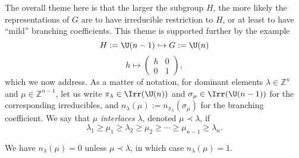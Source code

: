 \documentclass[reqno]{amsart} 
\begin{document}
The overall theme here is that the larger the subgroup $H$, the more likely the representations of $G$ are to have irreducible restriction to $H$, or at least to have ``mild'' branching coefficients.  This theme is supported further by the example
\begin{equation}\label{eq:}
  H := \U(n-1)
  \hookrightarrow G := \U(n)
\end{equation}
\begin{equation*}
  h \mapsto 
\begin{pmatrix}
    h & 0 \\
    0 & 1
  \end{pmatrix}
,
\end{equation*}
which we now address.  As a matter of notation, for dominant elements $\lambda \in \mathbb{Z}^n$ and $\mu \in \mathbb{Z}^{n-1}$, let us write $\pi_\lambda \in \Irr(\U(n))$ and $\sigma_{\mu} \in \Irr(\U(n-1))$ for the corresponding irreducibles, and $n_\lambda(\mu) := n_{\pi_\lambda}(\sigma_\mu)$ for the branching coefficient.  We say that $\mu$ \emph{interlaces} $\lambda$, denoted $\mu \prec \lambda$, if
\begin{equation}\label{eq:}
  \lambda_1 \geq \mu_1 \geq \lambda_2 \geq \mu_2
  \geq \dotsb \geq \mu_{n-1} \geq \lambda_n.
\end{equation}
\begin{theorem}
  We have $n_\lambda(\mu) = 0$ unless $\mu \prec \lambda$, in which case $n_\lambda(\mu) = 1$.
\end{theorem}
\end{document}

